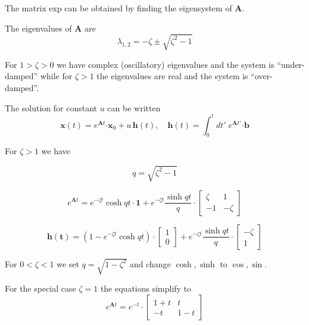 \documentclass[11pt,a4paper]{article}
\begin{document}
The matrix exp can be obtained by finding the eigensystem of $\mathbf{A}$.

The eigenvalues of $\mathbf{A}$ are
\begin{equation}
\lambda_{1,2} = -\zeta \pm \sqrt{\zeta^2-1}
\end{equation}

For $1 > \zeta > 0$ we have complex (oscillatory) eigenvalues and the system is ``under-damped'' while for $ \zeta > 1$ the eigenvalues are real and the system is ``over-damped''.

The solution for constant $u$ can be written 
\begin{equation}
\mathbf{x}(t) = e^{\mathbf{A}t}\mathbf{\cdot x}_0 + 
u \, \mathbf{h}(t), 
\quad
\mathbf{h}(t) = \int_0^t dt'\; e^{\mathbf{A}t'}\mathbf{\cdot b}
\end{equation}

For $\zeta>1$ we have

\begin{equation}
q = \sqrt{\zeta^2-1}
\end{equation}

\begin{equation}
e^{\mathbf{A}t} = e^{-\zeta t} \cosh qt \cdot \mathbf{1} +
e^{-\zeta t}\frac{\sinh qt}{q} \cdot
\left[\begin{matrix}
\zeta & 1 \\
-1 & -\zeta
\end{matrix}\right]
\end{equation}

\begin{equation}
\mathbf{h(t)} = 
\left( 1 - e^{-\zeta t} \cosh qt \right)\cdot
\left[\begin{matrix}
1 \\
0
\end{matrix}\right] 
+ e^{-\zeta t}\frac{\sinh qt}{q}\cdot
\left[\begin{matrix}
-\zeta \\
1 
\end{matrix}\right]
\end{equation}

For $0 < \zeta <1$ we set $q=\sqrt{1-\zeta^2}$ and change $\cosh, \sinh$ to $\cos, \sin$.

For the special case $\zeta=1$ the equations simplify to
\begin{equation}
e^{\mathbf{A}t} = e^{-t}\cdot
\left[\begin{matrix}
1+t & t \\
-t & 1-t
\end{matrix}\right]
\end{equation}
\end{document}
